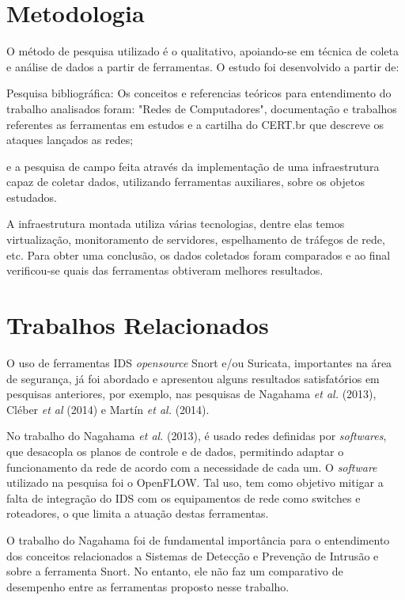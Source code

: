 \section{Metodologia} \label{sec:metodologia}

O método de pesquisa utilizado é o qualitativo, apoiando-se em técnica de coleta e análise de dados a partir de ferramentas. O estudo foi desenvolvido a partir de:

\begin{alineas}
\item Pesquisa bibliográfica: Os conceitos e referencias teóricos para entendimento do trabalho analisados foram: "Redes de Computadores", documentação e trabalhos referentes as ferramentas em estudos e a cartilha do CERT.br que descreve os ataques lançados as redes;
\item e a pesquisa de campo feita através da implementação de uma infraestrutura capaz de coletar dados, utilizando ferramentas auxiliares, sobre os objetos estudados.
\end{alineas}

A infraestrutura montada utiliza várias tecnologias, dentre elas temos virtualização, monitoramento de servidores, espelhamento de tráfegos de rede, etc. Para obter uma conclusão, os dados coletados foram comparados e ao final verificou-se quais das ferramentas obtiveram melhores resultados.

\section{Trabalhos Relacionados} \label{sec:trabalhos-relacionados}

O uso de ferramentas IDS \textit{opensource} Snort e/ou Suricata, importantes na área de segurança, já foi abordado e apresentou alguns resultados satisfatórios em pesquisas anteriores, por exemplo, nas pesquisas de Nagahama \textit{et al.} (2013), Cléber \textit{et al} (2014) e Martín \textit{et al.} (2014). 

No trabalho do Nagahama \textit{et al.} (2013), é usado redes definidas por \textit{softwares}, que desacopla os planos de controle e de dados, permitindo adaptar o funcionamento da rede de acordo com a necessidade de cada um. O \textit{software} utilizado na pesquisa foi o OpenFLOW. Tal uso, tem como objetivo mitigar a falta de integração do IDS com os equipamentos de rede como {switches} e roteadores, o que limita a atuação destas ferramentas. 

O trabalho do Nagahama foi de fundamental importância para o entendimento dos conceitos relacionados a Sistemas de Detecção e Prevenção de Intrusão e sobre a ferramenta Snort. No entanto, ele não faz um comparativo de desempenho entre as ferramentas proposto nesse trabalho.

